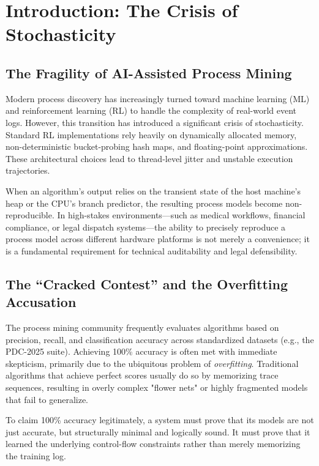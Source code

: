 \chapter{Introduction: The Crisis of Stochasticity}
\section{The Fragility of AI-Assisted Process Mining}
Modern process discovery has increasingly turned toward machine learning (ML) and reinforcement learning (RL) to handle the complexity of real-world event logs. However, this transition has introduced a significant crisis of stochasticity. Standard RL implementations rely heavily on dynamically allocated memory, non-deterministic bucket-probing hash maps, and floating-point approximations. These architectural choices lead to thread-level jitter and unstable execution trajectories. 

When an algorithm's output relies on the transient state of the host machine's heap or the CPU's branch predictor, the resulting process models become non-reproducible. In high-stakes environments—such as medical workflows, financial compliance, or legal dispatch systems—the ability to precisely reproduce a process model across different hardware platforms is not merely a convenience; it is a fundamental requirement for technical auditability and legal defensibility.

\section{The ``Cracked Contest'' and the Overfitting Accusation}
The process mining community frequently evaluates algorithms based on precision, recall, and classification accuracy across standardized datasets (e.g., the PDC-2025 suite). Achieving 100\% accuracy is often met with immediate skepticism, primarily due to the ubiquitous problem of \textit{overfitting}. Traditional algorithms that achieve perfect scores usually do so by memorizing trace sequences, resulting in overly complex "flower nets" or highly fragmented models that fail to generalize.

To claim 100\% accuracy legitimately, a system must prove that its models are not just accurate, but structurally minimal and logically sound. It must prove that it learned the underlying control-flow constraints rather than merely memorizing the training log.

